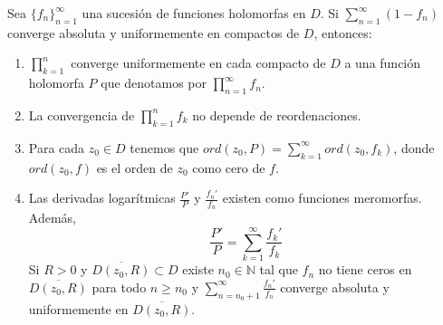 \begin{theorem}
    Sea $\{f_n\}_{n=1}^\infty$ una sucesión de funciones holomorfas en $D$.
    Si $\sum_{n=1}^\infty (1-f_n)$ converge absoluta y uniformemente en compactos de $D$, entonces:
    \begin{enumerate}
        \item $\prod_{k=1}^n$ converge uniformemente en cada compacto de $D$ a una función holomorfa $P$ que denotamos por $\prod_{n=1}^\infty f_n$.
        \item La convergencia de $\prod_{k=1}^n f_k$ no depende de reordenaciones.
        \item Para cada $z_0 \in D$ tenemos que $ord(z_0, P) = \sum_{k=1}^\infty ord(z_0, f_k)$, donde $ord(z_0, f)$ es el orden de $z_0$ como cero de $f$.
        \item Las derivadas logarítmicas $\frac{P'}{P}$ y $\frac{f_n'}{f_n}$ existen como funciones meromorfas.
              Además,
              $$\frac{P'}{P} = \sum_{k=1}^\infty \frac{f_k'}{f_k}$$
              Si $R > 0$ y $\overline{D(z_0, R)} \subset D$ existe $n_0 \in \mathbb{N}$ tal que $f_n$ no tiene ceros en $\overline{D(z_0, R)}$ para todo $n \geq n_0$ y $\sum_{n=n_0+1}^\infty \frac{f_n'}{f_n}$ converge absoluta y uniformemente en $\overline{D(z_0, R)}$.
    \end{enumerate}
\end{theorem}

